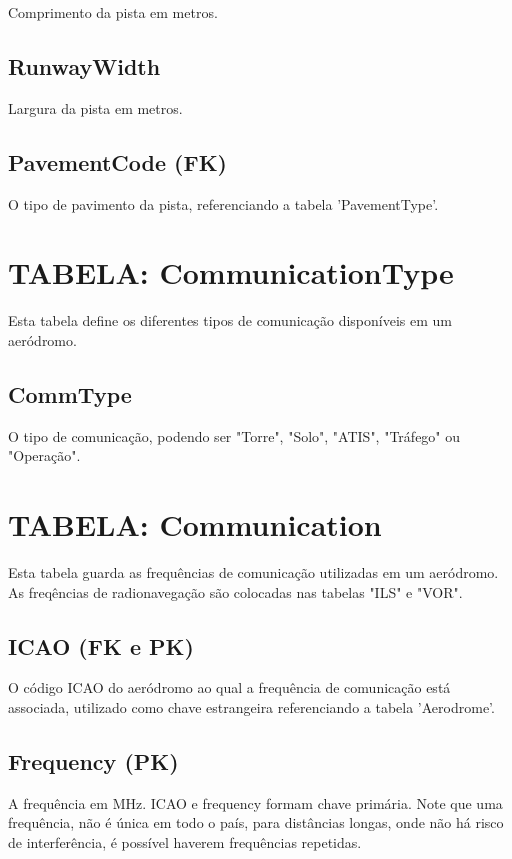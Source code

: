 Comprimento da pista em metros.

\subsection{RunwayWidth}

Largura da pista em metros.

\subsection{PavementCode (FK)}

O tipo de pavimento da pista, referenciando a tabela 'PavementType'.


\section{TABELA: CommunicationType}

Esta tabela define os diferentes tipos de comunicação disponíveis em um aeródromo.

\subsection{CommType}
O tipo de comunicação, podendo ser "Torre", "Solo", "ATIS", "Tráfego" ou "Operação".


\section{TABELA: Communication}

Esta tabela guarda as frequências de comunicação utilizadas em um aeródromo. As 
freqências de radionavegação são colocadas nas tabelas "ILS" e "VOR".

\subsection{ICAO (FK e PK)}
O código ICAO do aeródromo ao qual a frequência de comunicação está associada, utilizado 
como chave estrangeira referenciando a tabela 'Aerodrome'.

\subsection{Frequency (PK)}
A frequência em MHz. ICAO e frequency formam chave primária. Note que uma frequência,
não é única em todo o país, para distâncias longas, onde não há risco de interferência,
é possível haverem frequências repetidas.

